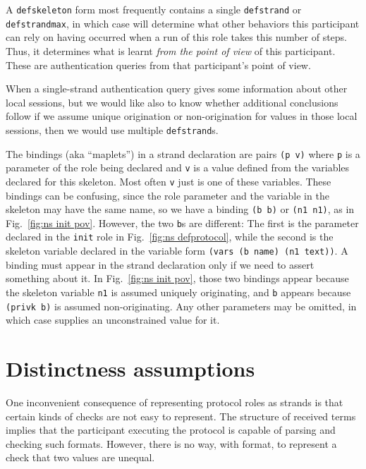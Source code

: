 A \texttt{defskeleton} form most frequently contains a single
\texttt{defstrand} or \texttt{defstrandmax}, in which case {\cpsa}
will determine what other behaviors this participant can rely on
having occurred when a run of this role takes this number of steps.
Thus, it determines what is learnt \emph{from the point of view} of
this participant.  These are authentication queries from that
participant's point of view.

When a single-strand authentication query gives some information about
other local sessions, but we would like also to know whether
additional conclusions follow if we assume unique origination or
non-origination for values in those local sessions, then we would use
multiple \texttt{defstrand}s.

The bindings (aka ``maplets'') in a strand declaration are pairs
\texttt{(p v)} where \texttt{p} is a parameter of the role being
declared and \texttt{v} is a value defined from the variables declared
for this skeleton.  Most often \texttt{v} just is one of these
variables.  These bindings can be confusing, since the role parameter
and the variable in the skeleton may have the same name, so we have a
binding \texttt{(b b)} or \texttt{(n1 n1)}, as in Fig.~\ref{fig:ns
  init pov}.  However, the two \texttt{b}s are different:  The first
is the parameter declared in the \texttt{init} role in
Fig.~\ref{fig:ns defprotocol}, while the second is the skeleton
variable declared in the variable form \texttt{(vars (b name) (n1
  text))}.  A binding must appear in the strand declaration only if we
need to assert something about it.  In Fig.~\ref{fig:ns init pov},
those two bindings appear because the skeleton variable \texttt{n1} is
assumed uniquely originating, and \texttt{b} appears because
\texttt{(privk b)} is assumed non-originating.  Any other parameters
may be omitted, in which case {\cpsa} supplies an unconstrained value
for it.    

\iffalse

\section{Distinctness assumptions}
\label{sec:distinct_decls}

One inconvenient consequence of representing protocol roles as strands
is that certain kinds of checks are not easy to represent.  The
structure of received terms implies that the participant executing the
protocol is capable of parsing and checking such formats.  However,
there is no way, with format, to represent a check that two values are
unequal.

